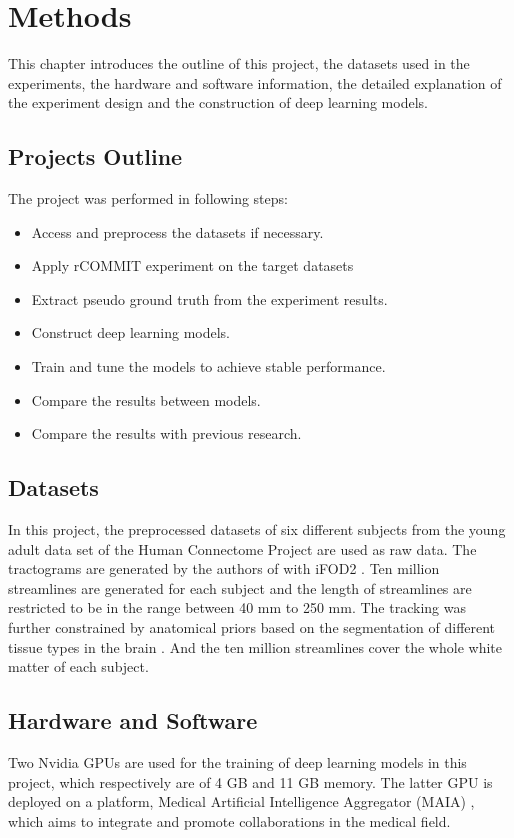 \chapter{Methods}

This chapter introduces the outline of this project, the datasets used in the experiments, the hardware and software information, the detailed 
explanation of the experiment design and the construction of deep learning models.

\section{Projects Outline}
The project was performed in following steps:
\begin{itemize}
    \item Access and preprocess the datasets if necessary.
    \item Apply rCOMMIT experiment on the target datasets
    \item Extract pseudo ground truth from the experiment results.
    \item Construct deep learning models.
    \item Train and tune the models to achieve stable performance.
    \item Compare the results between models.
    \item Compare the results with previous research.
  \end{itemize}

\section{Datasets}
In this project, the preprocessed datasets of six different subjects from the young adult data set of the Human Connectome Project \cite{vanessenWUMinnHumanConnectome2013} are used as raw data.
The tractograms are generated by the authors of \cite{TractSegFastAccurate} with iFOD2 \cite{tournierImprovedProbabilisticStreamlinesa}. 
Ten million streamlines are generated for each subject and the length of streamlines are restricted to be in the range between 40 mm to 250 mm.
The tracking was further constrained by anatomical priors based on the segmentation of different tissue types in the brain \cite{smithAnatomicallyconstrainedTractographyImproved2012}.
And the ten million streamlines cover the whole white matter of each subject. 

\section{Hardware and Software}
Two Nvidia GPUs are used for the training of deep learning models in this project, which respectively are of 4 GB and 11 GB memory. 
The latter GPU is deployed on a platform, Medical Artificial Intelligence Aggregator (MAIA) \cite{MAIA}, which aims to integrate and promote collaborations in the medical field.

